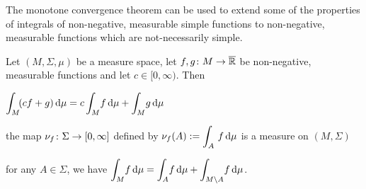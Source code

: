 The monotone convergence theorem can be used to extend some of the properties of integrals of non-negative, measurable simple functions to non-negative, measurable functions which are not-necessarily simple.

\bl
Let $(M,\Sigma,\mu)$ be a measure space, let $f,g\colon M\to \overline{\mathbb{R}}$ be non-negative, measurable functions and let $c\in [0,\infty)$. Then
\ben[label=(\roman*)]
\item $\displaystyle \int_{M}\! (cf+g) \,\mathrm{d} \mu = c\int_{M}\! f \,\mathrm{d} \mu +\int_{M}\! g \,\mathrm{d} \mu $
\item the map $\nu_f\colon \Sigma\to [0,\infty]$ defined by $\displaystyle \nu_f(A):=\int_A\, f\, \mathrm{d} \mu$ is a measure on $(M,\Sigma)$
\item for any $A\in\Sigma$, we have $\displaystyle \int_{M}\!f \,\mathrm{d} \mu =  \int_{A}\!f \,\mathrm{d} \mu+ \int_{M\setminus A}\!f \,\mathrm{d} \mu$.
\een
\el


